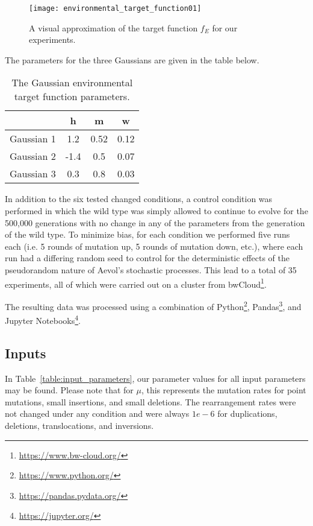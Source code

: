 \begin{figure}[H]
	\centering
	\texttt{[image: environmental\_target\_function01]}
	\caption[Experimental target function]{A visual approximation of the target function $f_E$ for our experiments.}
	\label{fig:target_function}
\end{figure}
 The parameters for the three Gaussians are given in the table below. 
\begin{table}[H]
	\centering
	\begin{tabular}{|c||c|c|c|}
		\cline{2-4}
		
		\multicolumn{1}{c||}{}& \textbf{h} & \textbf{m} & \textbf{w} \\
		\hline \hline
		Gaussian 1 & 1.2 & 0.52 & 0.12 \\
		\hline
		Gaussian 2 & -1.4 & 0.5 & 0.07 \\
		\hline
		Gaussian 3 & 0.3 & 0.8 & 0.03 \\
		\hline
	\end{tabular}
	\caption[Gaussian environmental parameters]{The Gaussian environmental target function parameters.}
	\label{table:gaussian_environment_params}
\end{table}
 
In addition to the six tested changed conditions, a control condition was performed in which the wild type was simply allowed to continue to evolve for the 500,000 generations with no change in any of the parameters from the generation of the wild type. To minimize bias, for each condition we performed five runs each (i.e. 5 rounds of mutation up, 5 rounds of mutation down, etc.), where each run had a differing random seed to control for the deterministic effects of the pseudorandom nature of Aevol's stochastic processes. This lead to a total of 35 experiments, all of which were carried out on a cluster from bwCloud\footnote{\url{https://www.bw-cloud.org/}}. 

The resulting data was processed using a combination of Python\footnote{\url{https://www.python.org/}}, Pandas\footnote{\url{https://pandas.pydata.org/}}, and Jupyter Notebooks\footnote{\url{https://jupyter.org/}}.  

\subsection{Inputs}
In Table~\ref{table:input_parameters}, our parameter values for all input parameters may be found. Please note that for $\mu$, this represents the mutation rates for point mutations, small insertions, and small deletions. The rearrangement rates were not changed under any condition and were always $1e-6$ for duplications, deletions, translocations, and inversions. 

